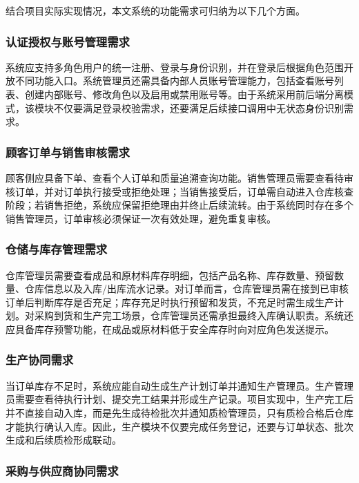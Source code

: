 结合项目实际实现情况，本文系统的功能需求可归纳为以下几个方面。

\subsubsection{认证授权与账号管理需求}

系统应支持多角色用户的统一注册、登录与身份识别，并在登录后根据角色范围开放不同功能入口。系统管理员还需具备内部人员账号管理能力，包括查看账号列表、创建内部账号、修改角色以及启用或禁用账号等。由于系统采用前后端分离模式，该模块不仅要满足登录校验需求，还要满足后续接口调用中无状态身份识别需求。

\subsubsection{顾客订单与销售审核需求}

顾客侧应具备下单、查看个人订单和质量追溯查询功能。销售管理员需要查看待审核订单，并对订单执行接受或拒绝处理；当销售接受后，订单需自动进入仓库核查阶段；若销售拒绝，系统应保留拒绝理由并终止后续流转。由于系统同时存在多个销售管理员，订单审核必须保证一次有效处理，避免重复审核。

\subsubsection{仓储与库存管理需求}

仓库管理员需要查看成品和原材料库存明细，包括产品名称、库存数量、预留数量、仓库信息以及入库/出库流水记录。对订单而言，仓库管理员需在接到已审核订单后判断库存是否充足；库存充足时执行预留和发货，不充足时需生成生产计划。对采购到货和生产完工场景，仓库管理员还需承担最终入库确认职责。系统还应具备库存预警功能，在成品或原材料低于安全库存时向对应角色发送提示。

\subsubsection{生产协同需求}

当订单库存不足时，系统应能自动生成生产计划订单并通知生产管理员。生产管理员需要查看待执行计划、提交完工结果并形成生产记录。项目实现中，生产完工后并不直接自动入库，而是先生成待检批次并通知质检管理员，只有质检合格后仓库才能执行确认入库。因此，生产模块不仅要完成任务登记，还要与订单状态、批次生成和后续质检形成联动。

\subsubsection{采购与供应商协同需求}

